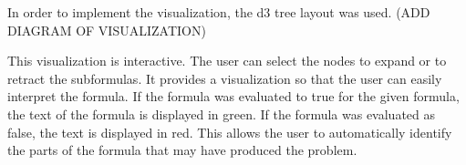 In order to implement the visualization, the d3 tree layout was used. (ADD DIAGRAM OF VISUALIZATION)

This visualization is interactive. The user can select the nodes to expand or to retract the subformulas. It provides a visualization so that the user can easily interpret the formula. If the formula was evaluated to true for the given formula, the text of the formula is displayed in green. If the formula was evaluated as false, the text is displayed in red. This allows the user to automatically identify the parts of the formula that may have produced the problem. 